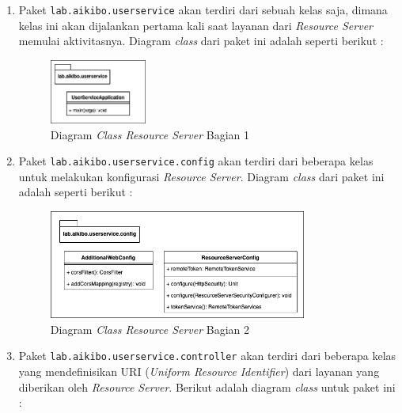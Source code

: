 \documentclass[pdftex,12pt, oneside]{article}
\begin{document}
\begin{enumerate}

	\item Paket \texttt{lab.aikibo.userservice} akan terdiri dari sebuah kelas saja, dimana kelas ini akan dijalankan pertama kali saat layanan dari \textit{Resource Server} memulai aktivitasnya. Diagram \textit{class} dari paket ini adalah seperti berikut :
	
	\begin{figure}[H]
		\centering
		\includegraphics[width=0.3\textwidth]{./resources/class-dia-resource-1}
		\caption{Diagram \textit{Class Resource Server} Bagian 1}
		\label{fig:class-dia-resource-1}
	\end{figure}
	
	\item Paket \texttt{lab.aikibo.userservice.config} akan terdiri dari beberapa kelas untuk melakukan konfigurasi \textit{Resource Server}. Diagram \textit{class} dari paket ini adalah seperti berikut :
	
	\begin{figure}[H]
		\centering
		\includegraphics[width=0.8\textwidth]{./resources/class-dia-resource-2}
		\caption{Diagram \textit{Class Resource Server} Bagian 2}
		\label{fig:class-dia-resource-2}
	\end{figure}
	
	\item Paket \texttt{lab.aikibo.userservice.controller} akan terdiri dari beberapa kelas yang mendefinisikan URI (\textit{Uniform Resource Identifier}) dari layanan yang diberikan oleh \textit{Resource Server}. Berikut adalah diagram \textit{class} untuk paket ini :
	

\end{enumerate}
\end{document}

